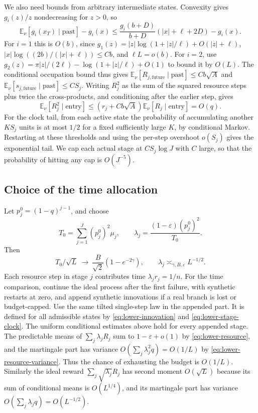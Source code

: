 \documentclass[11pt]{article}
\newcommand{\1}{\mathbf{1}}
\numberwithin{equation}{section}
\newcommand{\E}{\mathbb E}
\begin{document}
We also need bounds from arbitrary intermediate states.
Convexity gives \(g_i(z)/z\) nondecreasing for \(z>0\),
so
\[
 \E_\nu[g_i(x_T)\mid\mathrm{past}]-g_i(x)
 \le \frac{g_i(b+D)}{b+D}(|x|+\ell+2D)-g_i(x).
\]
For \(i=1\) this is \(O(b)\), since
\(g_1(z)=|z|\log(1+|z|/\ell)+O(|z|+\ell)\),
\(|x|\log((2b)/(|x|+\ell))\le Cb\), and \(\ell L=o(b)\).
For \(i=2\), use
\(g_2(z)=\pi|z|/(2\ell)-\log(1+|z|/\ell)+O(1)\)
to bound it by \(O(L)\).
The conditional occupation bound thus gives
\(\E_\nu[R_{j,\mathrm{future}}\mid\mathrm{past}]\le Cb\sqrt A\)
and \(\E_\nu[s_{j,\mathrm{future}}\mid\mathrm{past}]\le CS_j\).
Writing \(R_j^2\) as the sum of the squared resource steps
plus twice the cross-products, and conditioning after the
earlier step, gives
\begin{equation}\label{eq:lower-resource-variance}
 \E_\nu[R_j^2\mid\mathrm{entry}]
 \le (r_j+Cb\sqrt A)\E_\nu[R_j\mid\mathrm{entry}]=O(q).
\end{equation}
For the clock tail, from
each active state the probability of accumulating another
\(K S_j\) units is at most \(1/2\) for a fixed sufficiently
large \(K\), by conditional Markov. Restarting at these
thresholds and using the per-step overshoot \(o(S_j)\)
gives the exponential tail. We cap each actual stage at
\(C S_j\log J\) with \(C\) large, so that the probability of
hitting any cap is \(O(J^{-5})\).

\subsection{Choice of the time allocation}

Let \(p_j^0=(1-q)^{j-1}\), and choose
\[
 T_0=\sum_{j=1}^J(p_j^0)^2\mu_j,\qquad
 \lambda_j=\frac{(1-\varepsilon)(p_j^0)^2}{T_0}.
\]
Then
\begin{equation}\label{eq:lower-resource-total}
 T_0/\sqrt L\ \longrightarrow\
 \frac{B}{\sqrt2}(1-e^{-2\gamma}),\qquad
 \lambda_j\asymp_{\gamma,B,\varepsilon}L^{-1/2}.
\end{equation}
Each resource step in stage \(j\) contributes time
\(\lambda_j r_j=1/n\). For the time comparison, continue the
ideal process after the first failure, with synthetic
restarts at zero, and append synthetic innovations if a
real branch is lost or budget-capped. Use the same tilted
single-step law in the appended part. It is defined for
all admissible states by \eqref{eq:lower-innovation} and \eqref{eq:lower-stage-clock}. The uniform
conditional estimates above hold for every appended stage.
The predictable means of \(\sum_j\lambda_j R_j\) sum to
\(1-\varepsilon+o(1)\) by \eqref{eq:lower-resource}, and the martingale part has
variance \(O(\sum_j\lambda_j^2 q)=O(1/L)\) by \eqref{eq:lower-resource-variance}.
Thus the chance of exhausting the budget is \(O(1/L)\).
Similarly the ideal reward \(\sum_j\sqrt{\lambda_j}R_j\)
has second moment \(O(\sqrt L)\) because its sum of conditional
means is \(O(L^{1/4})\), and its martingale part has
variance \(O(\sum_j\lambda_j q)=O(L^{-1/2})\).
\end{document}
